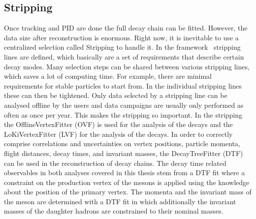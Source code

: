 
\subsection{Stripping}
\label{sec:detector:software:stripping}

Once tracking and PID are done the full decay chain can be fitted. However,
the data size after reconstruction is enormous. Right now, it is inevitable to
use a centralized selection called Stripping to handle it. In the \davinci
framework~\cite{DaVinci} stripping lines are defined, which basically are a
set of requirements that describe certain decay modes. Many selection steps
can be shared between various stripping lines, which saves a lot of computing
time. For example, there are minimal requirements for stable particles to
start from. In the individual stripping lines these can then be tightened.
Only data selected by a stripping line can be analysed offline by the users
and data campaigns are usually only performed as often as once per year. This
makes the stripping so important. In the stripping the OfflineVertexFitter
(OVF) is used for the analysis of the \BdToJPsiKS decays and the
LoKiVertexFitter (LVF) for the analysis of the \BdToDD decays. In order to
correctly comprise correlations and uncertainties on vertex positions,
particle momenta, flight distances, decay times, and invariant masses, the
\mbox{DecayTreeFitter} (DTF)~\cite{Hulsbergen:2005pu} can be used in the
reconstruction of decay chains. The decay time related observables in both
analyses covered in this thesis stem from a DTF fit where a constraint on the
production vertex of the \Bd mesons is applied using the knowledge about the
position of the primary vertex. The momenta and the invariant mass of the \Bd
meson are determined with a DTF fit in which additionally the invariant masses
of the daughter hadrons are constrained to their nominal masses.